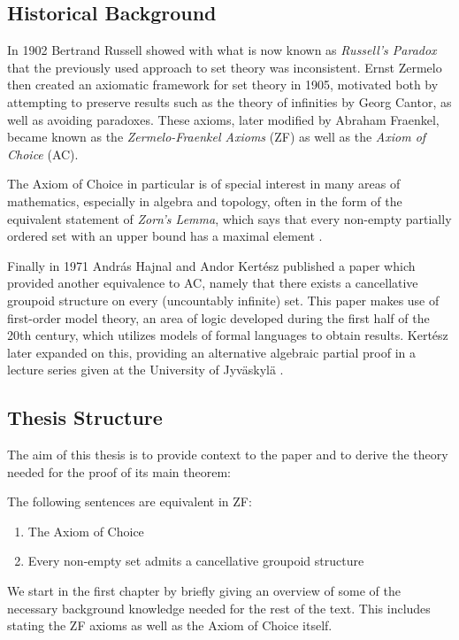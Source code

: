 \documentclass[../../main.tex]{subfiles}
\begin{document}
\subsection*{Historical Background}

In 1902 Bertrand Russell showed with what is now known as \textit{Russell's Paradox} that the previously used approach to set theory was inconsistent.
Ernst Zermelo then created an axiomatic framework for set theory in 1905, motivated both by attempting to preserve results such as the theory of infinities by Georg Cantor, as well as avoiding paradoxes.
These axioms, later modified by Abraham Fraenkel, became known as the \textit{Zermelo-Fraenkel Axioms} (ZF) as well as the \textit{Axiom of Choice} (AC)\cite[pp.66-70, 75]{Gol17}.

The Axiom of Choice in particular is of special interest in many areas of mathematics, especially in algebra and topology, often in the form of the equivalent statement of \textit{Zorn's Lemma},
which says that every non-empty partially ordered set with an upper bound has a maximal element \cite{Jec78}.

Finally in 1971 András Hajnal and Andor Kertész published a paper \cite{Haj72} which provided another equivalence to AC, namely that there exists a cancellative groupoid structure on every (uncountably infinite) set.
This paper makes use of first-order model theory, an area of logic developed during the first half of the 20th century, which utilizes models of formal languages to obtain results.
Kertész later expanded on this, providing an alternative algebraic partial proof in a lecture series given at the University of Jyväskylä \cite{Ker75}.

\subsection*{Thesis Structure}

The aim of this thesis is to provide context to the paper \cite{Haj72} and to derive the theory needed for the proof of its main theorem:
\begin{utheorem}
    The following sentences are equivalent in ZF:
    \begin{enumerate}
        \item The Axiom of Choice
        \item Every non-empty set admits a cancellative groupoid structure
    \end{enumerate}
\end{utheorem}
We start in the first chapter by briefly giving an overview of some of the necessary background knowledge needed for the rest of the text.
This includes stating the ZF axioms as well as the Axiom of Choice itself.
\end{document}
